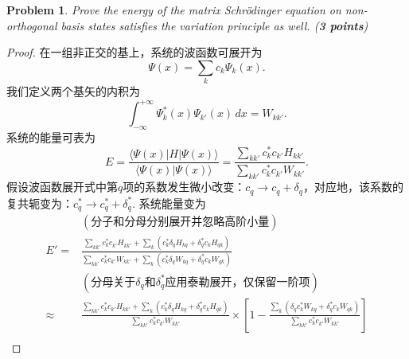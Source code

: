 \documentclass[UTF8,10pt,a4paper]{article}
\theoremstyle{Problem}
\newtheorem{prob}{Problem}
\theoremstyle{Solution}
\begin{document}
\begin{prob}
    Prove the energy of the matrix Schrödinger equation on non-orthogonal basis states satisfies the variation principle as well. (\textbf{3 points})
\end{prob}
\begin{proof}
    在一组非正交的基上，系统的波函数可展开为
    \begin{equation}
        \Psi(x)=\sum_kc_k\Psi_k(x).
    \end{equation}
    我们定义两个基矢的内积为
    \begin{equation}
        \int_{-\infty}^{+\infty}\Psi_k^*(x)\Psi_{k'}(x)\,dx=W_{kk'}.
    \end{equation}
    系统的能量可表为
    \begin{equation}
        \label{2-E}
        E=\frac{\langle\Psi(x)\rvert H\lvert\Psi(x)\rangle}{\langle\Psi(x)\vert\Psi(x)\rangle}=\frac{\sum_{kk'}c_k^*c_{k'}H_{kk'}}{\sum_{kk'}c_k^*c_{k'}W_{kk'}}.
    \end{equation}
    假设波函数展开式中第$q$项的系数发生微小改变：$c_q\rightarrow c_q+\delta_q$，对应地，该系数的复共轭变为：$c_q^*\rightarrow c_q^*+\delta_q^*$. 系统能量变为
    \begin{align}
        \nonumber        & (\text{分子和分母分别展开并忽略高阶小量})                                                                                                                                                                                                                                    \\
        \nonumber E'=    & \frac{\sum_{kk'}c_k^*c_{k'}H_{kk'}+\sum_k(c_k^*\delta_qH_{kq}+\delta_q^*c_kH_{qk})}{\sum_{kk'}c_k^*c_{k'}W_{kk'}+\sum_k(c_k^*\delta_qW_{kq}+\delta_q^*c_kW_{qk})}                                                                                                            \\
        \nonumber        & (\text{分母关于$\delta_q$和$\delta_q^*$应用泰勒展开，仅保留一阶项})                                                                                                                                                                                                          \\
        \nonumber\approx & \frac{\sum_{kk'}c_k^*c_{k'}H_{kk'}+\sum_k(c_k^*\delta_qH_{kq}+\delta_q^*c_kH_{qk})}{\sum_{kk'}c_k^*c_{k'}W_{kk'}}\times\left[1-\frac{\sum_k(\delta_qc_k^*W_{kq}+\delta_q^*c_kW_{qk})}{\sum_{kk'}c_k^*c_{k'}W_{kk'}}\right]                                                   \\

\end{align}
\end{proof}
\end{document}
